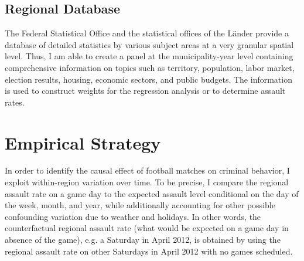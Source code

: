 \subsection{Regional Database}
The Federal Statistical Office and the statistical offices of the Länder provide a database of detailed statistics by various subject areas at a very granular spatial level. Thus, I am able to create a panel at the municipality-year level containing comprehensive information on topics such as territory, population, labor market, election results, housing, economic sectors, and public budgets. The information is used to construct weights for the regression analysis or to determine assault rates. 







\bigskip
\section{Empirical Strategy}\label{sec_soc_ext:empirical_strategy}

In order to identify the causal effect of football matches on criminal behavior, I exploit within-region variation over time. To be precise, I compare the regional assault rate on a game day to the expected assault level conditional on the day of the week, month, and year, while additionally accounting for other possible confounding variation due to weather and holidays. In other words, the counterfactual regional assault rate (what would be expected on a game day in absence of the game), e.g. a Saturday in April 2012, is obtained by using the regional assault rate on other Saturdays in April 2012 with no games scheduled. %


